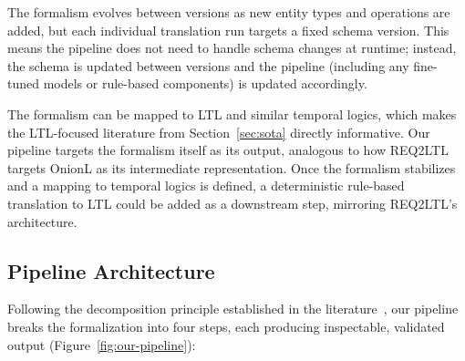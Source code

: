 The formalism evolves between versions as new entity types and operations
are added, but each individual translation run targets a fixed schema
version. This means the pipeline does not need to handle schema changes
at runtime; instead, the schema is updated between versions and the
pipeline (including any fine-tuned models or rule-based components) is
updated accordingly.

The formalism can be mapped to LTL and similar temporal logics, which
makes the LTL-focused literature from Section~\ref{sec:sota} directly
informative. Our pipeline targets the formalism itself as its output,
analogous to how REQ2LTL~\cite{ma2025req2ltl} targets OnionL as its
intermediate representation. Once the formalism stabilizes and a mapping
to temporal logics is defined, a deterministic rule-based translation to
LTL could be added as a downstream step, mirroring REQ2LTL's
architecture.

\subsection{Pipeline Architecture}
\label{sec:architecture}


Following the decomposition principle established in the
literature~\cite{khot2022decomposed,nouri2024safety}, our pipeline
breaks the formalization into four steps, each producing inspectable,
validated output (Figure~\ref{fig:our-pipeline}):


